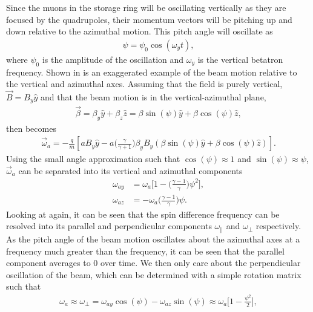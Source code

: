 Since the muons in the storage ring will be oscillating vertically as they are focused by the quadrupoles, their momentum vectors will be pitching up and down relative to the azimuthal motion. This pitch angle will oscillate as
        \begin{align} \label{eq:psi}
            \psi = \psi_{0} \cos(\omega_{y}t),
        \end{align}
where $\psi_{0}$ is the amplitude of the oscillation and $\omega_{y}$ is the vertical betatron frequency. Shown in  is an exaggerated example of the beam motion relative to the vertical and azimuthal axes. Assuming that the field is purely vertical, $\vec{B} = B_{y}\hat{y}$ and that the beam motion is in the vertical-azimuthal plane,
        \begin{align}
            \vec{\beta} = \beta_{y}\hat{y} + \beta_{z}\hat{z} = \beta\sin(\psi)\hat{y} + \beta\cos(\psi)\hat{z},
        \end{align}
then \wa becomes
        \begin{align}
            \vec{\omega}_{a} = -\frac{q}{m} [a B_{y} \hat{y} - a \Big(\frac{\gamma}{\gamma+1}\Big) \beta_{y}B_{y} (\beta\sin(\psi)\hat{y} + \beta\cos(\psi)\hat{z})].        
        \end{align}
Using the small angle approximation such that $\cos(\psi) \approx 1$ and $\sin(\psi) \approx \psi$, $\vec{\omega}_{a}$ can be separated into its vertical and azimuthal components
        \begin{align}
            \omega_{ay} &= \omega_{a}\Big[ 1 - \Big(\frac{\gamma-1}{\gamma}\Big) \psi^{2} \Big], \\     
            \omega_{az} &= -\omega_{a} \Big(\frac{\gamma-1}{\gamma}\Big) \psi.
        \end{align}
Looking at  again, it can be seen that the spin difference frequency can be resolved into its parallel and perpendicular components $\omega_{\parallel}$ and $\omega_{\perp}$ respectively. As the pitch angle of the beam motion oscillates about the azimuthal axes at a frequency much greater than the \gmtwo frequency, it can be seen that the parallel component averages to 0 over time. We then only care about the perpendicular oscillation of the beam, which can be determined with a simple rotation matrix such that
        \begin{align}
            \omega_{a} \approx \omega_{\perp} = \omega_{ay} \cos(\psi) - \omega_{az}\sin(\psi) \approx \omega_{a} \Big[ 1 - \frac{\psi^{2}}{2} \Big],
        \end{align}
